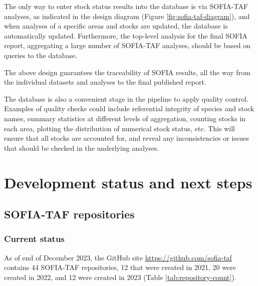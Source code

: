 \documentclass[12pt]{article}
\newcommand\blue[1]{\textcolor{darkblue}{#1}}
\begin{document}
The only way to enter stock status results into the database is via SOFIA-TAF
analyses, as indicated in the design diagram (Figure
\ref{fig:sofia-taf-diagram}), and when analyses of a specific areas and stocks
are updated, the database is automatically updated. Furthermore, the top-level
analysis for the final SOFIA report, aggregating a large number of SOFIA-TAF
analyses, should be based on queries to the database.

The above design guarantees the traceability of SOFIA results, all the way from
the individual datasets and analyses to the final published report.

The database is also a convenient stage in the pipeline to apply quality
control. Examples of quality checks could include referential integrity of
species and stock names, summary statistics at different levels of aggregation,
counting stocks in each area, plotting the distribution of numerical stock
status, etc. This will ensure that all stocks are accounted for, and reveal any
inconsistencies or issues that should be checked in the underlying analyses.

\newpage


\section{Development status and next steps}

\subsection{SOFIA-TAF repositories}

\subsubsection{Current status}

As of end of December 2023, the GitHub site
\blue{\url{https://github.com/sofia-taf}} contains 44 SOFIA-TAF repositories, 12
that were created in 2021, 20 were created in 2022, and 12 were created in 2023
(Table \ref{tab:repository-count}).
\end{document}
